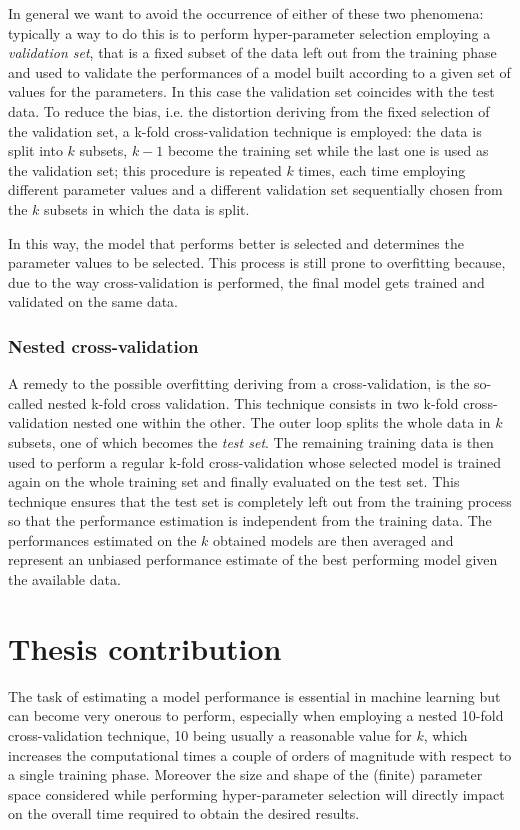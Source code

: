In general we want to avoid the occurrence of either of these two phenomena:
typically a way to do this is to perform hyper-parameter selection employing
a \emph{validation set}, that is a fixed subset of the data left out from the
training phase and used to validate the performances of a model built according
to a given set of values for the parameters.
In this case the validation set coincides with the test data.
To reduce the bias, i.e. the distortion deriving from the fixed selection of
the validation set, a k-fold cross-validation technique is employed: the
data is split into $k$ subsets, $k-1$ become the training set while the last one
is used as the validation set; this procedure is repeated $k$ times, each time employing
different parameter values and a different validation set sequentially chosen from the
$k$ subsets in which the data is split.

In this way, the model that performs better is selected and determines the parameter
values to be selected.
This process is still prone to overfitting because, due to the way cross-validation
is performed, the final model gets trained and validated on the same
data.

\subsubsection{Nested cross-validation}
A remedy to the possible overfitting deriving from a cross-validation, is
the so-called nested k-fold cross validation.
This technique consists in two k-fold cross-validation nested one within the other.
The outer loop splits the whole data in $k$ subsets, one of which becomes the
\emph{test set}.
The remaining training data is then used to perform a regular k-fold cross-validation
whose selected model is trained again on the whole training set and finally evaluated
on the test set.
This technique ensures that the test set is completely left out from the training
process so that the performance estimation is independent from the training data.
The performances estimated on the $k$ obtained models are then averaged and represent
an unbiased performance estimate of the best performing model given the available data.

\section{Thesis contribution}
The task of estimating a model performance is essential in machine learning
but can become very onerous to perform, especially when employing a nested 10-fold
cross-validation technique, 10 being usually a reasonable value for $k$, which
increases the computational times a couple of orders of magnitude with respect
to a single training phase.
Moreover the size and shape of the (finite) parameter space considered while performing
hyper-parameter selection will directly impact on the overall time required to
obtain the desired results.

